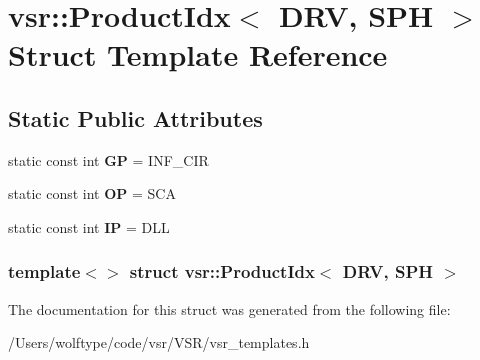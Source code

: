 \hypertarget{structvsr_1_1_product_idx_3_01_d_r_v_00_01_s_p_h_01_4}{\section{vsr\-:\-:Product\-Idx$<$ D\-R\-V, S\-P\-H $>$ Struct Template Reference}
\label{structvsr_1_1_product_idx_3_01_d_r_v_00_01_s_p_h_01_4}
}
\subsection*{Static Public Attributes}
\begin{DoxyCompactItemize}
\item 
\hypertarget{structvsr_1_1_product_idx_3_01_d_r_v_00_01_s_p_h_01_4_a1b4a94f3f243fc1c0c00df1a15c29b2e}{static const int {\bfseries G\-P} = I\-N\-F\-\_\-\-C\-I\-R}\label{structvsr_1_1_product_idx_3_01_d_r_v_00_01_s_p_h_01_4_a1b4a94f3f243fc1c0c00df1a15c29b2e}

\item 
\hypertarget{structvsr_1_1_product_idx_3_01_d_r_v_00_01_s_p_h_01_4_a6ed62a49b09302b4b362b36a7f7685b9}{static const int {\bfseries O\-P} = S\-C\-A}\label{structvsr_1_1_product_idx_3_01_d_r_v_00_01_s_p_h_01_4_a6ed62a49b09302b4b362b36a7f7685b9}

\item 
\hypertarget{structvsr_1_1_product_idx_3_01_d_r_v_00_01_s_p_h_01_4_aaaa2129f92d5cbb807b10ba34af8f4e7}{static const int {\bfseries I\-P} = D\-L\-L}\label{structvsr_1_1_product_idx_3_01_d_r_v_00_01_s_p_h_01_4_aaaa2129f92d5cbb807b10ba34af8f4e7}

\end{DoxyCompactItemize}
\subsubsection*{template$<$$>$ struct vsr\-::\-Product\-Idx$<$ D\-R\-V, S\-P\-H $>$}



The documentation for this struct was generated from the following file\-:\begin{DoxyCompactItemize}
\item 
/\-Users/wolftype/code/vsr/\-V\-S\-R/vsr\-\_\-templates.\-h\end{DoxyCompactItemize}
